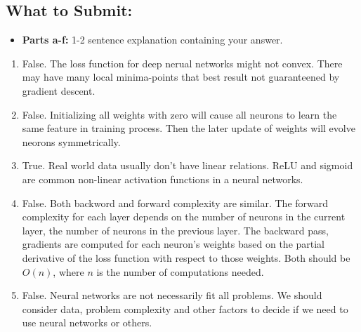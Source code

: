 \documentclass{article}
\begin{document}
\begin{aprob}
    \subsection*{What to Submit:}
    \begin{itemize}
        \item \textbf{Parts a-f:} 1-2 sentence explanation containing your answer.
    \end{itemize}
    \begin{enumerate}
        \item False. The loss function for deep nerual networks might not convex. There may have many local minima-points that best result not guaranteened by gradient descent.
        \item False. Initializing all weights with zero will cause all neurons to learn the same feature in training process. Then the later update of weights will evolve neorons symmetrically. 
        \item True. Real world data usually don't have linear relations. ReLU and sigmoid are common non-linear activation functions in a neural networks.
        \item False. Both backword and forward complexity are similar. The forward complexity for each layer depends on the number of neurons in the current layer, the number of neurons in the previous layer. The backward pass, gradients are computed for each neuron's weights based on the partial derivative of the loss function with respect to those weights. Both should be $O(n)$, where $n$ is the number of computations needed.
        \item False. Neural networks are not necessarily fit all problems. We should consider data, problem complexity and other factors to decide if we need to use neural networks or others.
    \end{enumerate}
\end{aprob}
\end{document}
